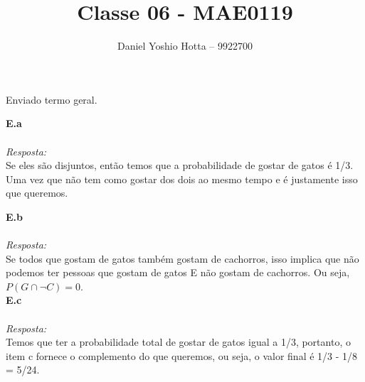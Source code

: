 \documentclass{article}
\begin{document}
	
	\title{Classe 06 - MAE0119}
	\author{Daniel Yoshio Hotta – 9922700}
	
	\maketitle	
	
		Enviado termo geral.
	
	\textbf {E.a} 
	\\ \\
	\textit {Resposta:} \\
    
    Se eles são disjuntos, então temos que a probabilidade de gostar de gatos é 1/3. Uma vez que não tem como gostar dos dois ao mesmo tempo e é justamente isso que queremos. \\
    
    \maketitle	
    
    \textbf {E.b} 
    \\ \\
    \textit {Resposta:} \\
	
    Se todos que gostam de gatos também gostam de cachorros, isso implica que não podemos ter pessoas que gostam de gatos E não gostam de cachorros. Ou seja, $P(G\cap \neg C) = 0$. \\
    
    \textbf {E.c} 
    \\ \\
    \textit {Resposta:} \\
    
    Temos que ter a probabilidade total de gostar de gatos igual a 1/3, portanto, o item c fornece o complemento do que queremos, ou seja, o valor final é 1/3 - 1/8 = 5/24.
	
\end{document}
